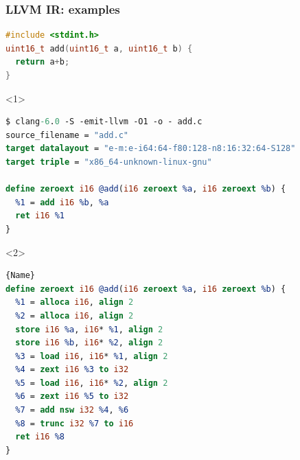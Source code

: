 \begin{frame}[fragile]
  \frametitle{LLVM IR: examples}
  \begin{lstlisting}[caption=C code,language=c,frame=leftline]
#include <stdint.h>
uint16_t add(uint16_t a, uint16_t b) {
  return a+b;
}
  \end{lstlisting}

  \begin{onlyenv}<1>
  \begin{lstlisting}[caption=LLVM IR for amd64/Linux with -O1,language=llvm,frame=leftline]
$ clang-6.0 -S -emit-llvm -O1 -o - add.c
source_filename = "add.c"
target datalayout = "e-m:e-i64:64-f80:128-n8:16:32:64-S128"
target triple = "x86_64-unknown-linux-gnu"

define zeroext i16 @add(i16 zeroext %a, i16 zeroext %b) {
  %1 = add i16 %b, %a
  ret i16 %1
}
  \end{lstlisting}
  \end{onlyenv}

  \begin{onlyenv}<2>
  \begin{lstlisting}[caption=LLVM IR for amd64/Linux w/o opt,language=llvm,frame=leftline]{Name}
define zeroext i16 @add(i16 zeroext %a, i16 zeroext %b) {
  %1 = alloca i16, align 2
  %2 = alloca i16, align 2
  store i16 %a, i16* %1, align 2
  store i16 %b, i16* %2, align 2
  %3 = load i16, i16* %1, align 2
  %4 = zext i16 %3 to i32
  %5 = load i16, i16* %2, align 2
  %6 = zext i16 %5 to i32
  %7 = add nsw i32 %4, %6
  %8 = trunc i32 %7 to i16
  ret i16 %8
}
  \end{lstlisting}
  \end{onlyenv}
\end{frame}

